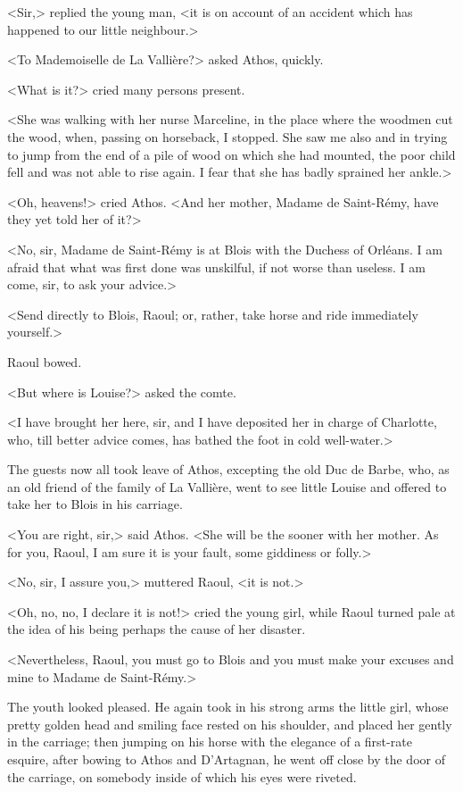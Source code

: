 <Sir,> replied the young man, <it is on account of an accident which has happened to our little neighbour.>

<To Mademoiselle de La Vallière?> asked Athos, quickly.

<What is it?> cried many persons present.

<She was walking with her nurse Marceline, in the place where the woodmen cut the wood, when, passing on horseback, I stopped. She saw me also and in trying to jump from the end of a pile of wood on which she had mounted, the poor child fell and was not able to rise again. I fear that she has badly sprained her ankle.>

<Oh, heavens!> cried Athos. <And her mother, Madame de Saint-Rémy, have they yet told her of it?>

<No, sir, Madame de Saint-Rémy is at Blois with the Duchess of Orléans. I am afraid that what was first done was unskilful, if not worse than useless. I am come, sir, to ask your advice.>

<Send directly to Blois, Raoul; or, rather, take horse and ride immediately yourself.>

Raoul bowed.

<But where is Louise?> asked the comte.

<I have brought her here, sir, and I have deposited her in charge of Charlotte, who, till better advice comes, has bathed the foot in cold well-water.>

The guests now all took leave of Athos, excepting the old Duc de Barbe, who, as an old friend of the family of La Vallière, went to see little Louise and offered to take her to Blois in his carriage.

<You are right, sir,> said Athos. <She will be the sooner with her mother. As for you, Raoul, I am sure it is your fault, some giddiness or folly.>

<No, sir, I assure you,> muttered Raoul, <it is not.>

<Oh, no, no, I declare it is not!> cried the young girl, while Raoul turned pale at the idea of his being perhaps the cause of her disaster.

<Nevertheless, Raoul, you must go to Blois and you must make your excuses and mine to Madame de Saint-Rémy.>

The youth looked pleased. He again took in his strong arms the little girl, whose pretty golden head and smiling face rested on his shoulder, and placed her gently in the carriage; then jumping on his horse with the elegance of a first-rate esquire, after bowing to Athos and D'Artagnan, he went off close by the door of the carriage, on somebody inside of which his eyes were riveted. 